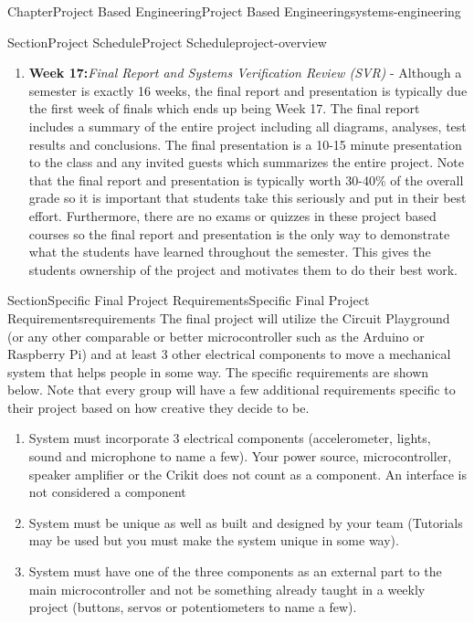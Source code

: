 \documentclass[oneside,10pt,]{book}
\newcommand{\terminology}[1]{\textbf{#1}}
\numberwithin{equation}{section}
\begin{document}
\begin{chapterptx}{Chapter}{Project Based Engineering}{}{Project Based Engineering}{}{}{systems-engineering}
\begin{sectionptx}{Section}{Project Schedule}{}{Project Schedule}{}{}{project-overview}
\begin{enumerate}
\item{}\terminology{Week 17:}\emph{Final Report and Systems Verification Review (SVR)} - Although a semester is exactly 16 weeks, the final report and presentation is typically due the first week of finals which ends up being Week 17. The final report includes a summary of the entire project including all diagrams, analyses, test results and conclusions. The final presentation is a 10-15 minute presentation to the class and any invited guests which summarizes the entire project. Note that the final report and presentation is typically worth 30-40\% of the overall grade so it is important that students take this seriously and put in their best effort. Furthermore, there are no exams or quizzes in these project based courses so the final report and presentation is the only way to demonstrate what the students have learned throughout the semester. This gives the students ownership of the  project and motivates them to do their best work.%
\end{enumerate}
%
\end{sectionptx}
%
%
\typeout{************************************************}
\typeout{************************************************}
%
\begin{sectionptx}{Section}{Specific Final Project Requirements}{}{Specific Final Project Requirements}{}{}{requirements}
The final project will utilize the Circuit Playground (or any other comparable or better microcontroller such as the Arduino or Raspberry Pi) and at least 3 other electrical components to move a mechanical system that helps people in some way. The specific requirements are shown below. Note that every group will have a few additional requirements specific to their project based on how creative they decide to be.%
\begin{enumerate}
\item{}System must incorporate 3 electrical components (accelerometer, lights, sound and microphone to name a few). Your power source, microcontroller, speaker amplifier or the Crikit does not count as a component. An interface is not considered a component%
\item{}System must be unique as well as built and designed by your team (Tutorials may be used but you must make the system unique in some way).%
\item{}System must have one of the three components as an external part to the main microcontroller and not be something already taught in a weekly project (buttons, servos or potentiometers to name a few).%

\end{enumerate}
\end{sectionptx}
\end{chapterptx}
\end{document}
